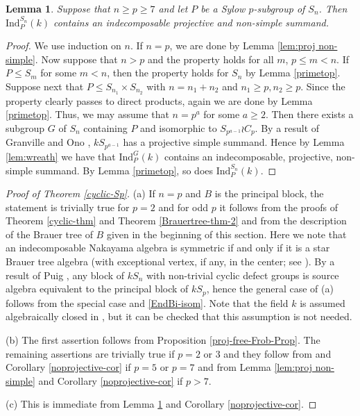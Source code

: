 \documentclass{amsart}
\theoremstyle{plain}\newtheorem{Theorem}{Theorem}[section]
\theoremstyle{plain}\newtheorem{Conjecture}[Theorem]{Conjecture}
\theoremstyle{plain}\newtheorem{Corollary}[Theorem]{Corollary}
\theoremstyle{plain}\newtheorem{Lemma}[Theorem]{Lemma}
\theoremstyle{plain}\newtheorem{Proposition}[Theorem]{Proposition}
\theoremstyle{definition}\newtheorem{Definition}[Theorem]{Definition}
\theoremstyle{definition}\newtheorem{Example}[Theorem]{Example}
\theoremstyle{definition}\newtheorem{Examples}[Theorem]{Examples}
\theoremstyle{definition}\newtheorem{Exercise}[Theorem]{Exercise}
\theoremstyle{definition}\newtheorem{Notation}[Theorem]{Notation}
\theoremstyle{definition}\newtheorem{Remark}[Theorem]{Remark}
\theoremstyle{definition}\newtheorem{Remarks}[Theorem]{Remarks}
\theoremstyle{plain}\newtheorem{Statement}[Theorem]{}
\def\Ind{\mathrm{Ind}}    \def\tenC{\otimes_C}
\begin{document}
\begin{Lemma} \label{ngreaterp}  Suppose that $n \geq  p \geq 7 $ and let  $P$ be a 
Sylow $p$-subgroup of $S_n $. Then $\Ind_P^{S_n} (k)$ contains an 
indecomposable  projective  and non-simple summand.    
\end{Lemma} 

\begin{proof}
We  use induction on $n$.   If $n=p $,  we are done by  Lemma \ref{lem:proj non-simple}.    
Now suppose that $ n >p $ and the  property   holds  for all $ m $, $ p\leq m <n $.    
If $P \leq S_m $ for some $m < n $, then the property  holds for $S_n$  by 
Lemma  \ref{primetop}.
Suppose next that   $ P \leq  S_{n_1} \times S_{n_2} $ with $n=n_1 +n_2  $  
and $n_1 \geq p,  n_2 \geq p $.  Since the property  clearly passes to direct 
products, again we are done by Lemma \ref{primetop}.
Thus, we may assume that  $n=p^a $  for some $a \geq 2 $.   Then there exists  a 
subgroup  $G$ of $S_n $ containing $P$   and  isomorphic to  $ S_{p^{a-1}} \wr C_p $.  
By   a result of    Granville and Ono   \cite[Theorem 1]{GO},   $kS_{p^{a-1}} $    has a 
projective  simple summand.   Hence  by Lemma \ref{lem:wreath}    we have that  
$\Ind_P^G (k) $  contains  an indecomposable, projective, non-simple summand. 
By Lemma  \ref{primetop}, so does $ \Ind^{S_n}_P(k) $.
\end{proof} 

\begin{proof}[{Proof of Theorem \ref{cyclic-Sp}}]   
(a)   If $ n=p $  and  $B$ is the principal block, the  statement is  trivially true  for 
$p=2 $ and for odd $p$ it  follows from the proofs  of  Theorem \ref{cyclic-thm}   
and Theorem \ref{Brauertree-thm-2}  and from  the description of  the Brauer 
tree of  $B$ given  in the beginning of this section.   Here we note    that  an
indecomposable  
Nakayama algebra is symmetric if and only if it  is  a star Brauer tree algebra 
(with exceptional vertex, if any, in the center; see  \cite[Sections 11.6, 11.7]{LiBookII}). 
 By a result of Puig \cite{PuScopes},   any block of    $kS_n $ with non-trivial cyclic 
 defect groups  is  source algebra 
 equivalent   to the  principal  block of $kS_p$,   hence   the general case of (a) follows 
 from the special   case  and \ref{EndBi-isom}.  Note that the field $k$ is assumed 
 algebraically closed in  
 \cite{PuScopes},  but it can be checked that this assumption is not needed.

(b)    The first   assertion  follows from
Proposition \ref{proj-free-Frob-Prop}.   The remaining assertions are  trivially true  
if   $p=2$    or $3$  and    they  follow   from     \cite[5.6.4,  5.6.4]{NaehrigPhD}  and 
Corollary \ref{noprojective-cor}   if $p=5 $  or $p =7 $  and  from  Lemma 
\ref{lem:proj non-simple}   and  Corollary \ref{noprojective-cor}  if $p>7 $.

(c)  This is immediate  from  Lemma \ref{ngreaterp}  and  Corollary 
\ref{noprojective-cor}.
\end{proof}
\end{document}
